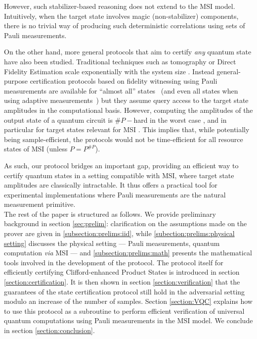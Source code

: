 \documentclass[a4paper,twocolumn,11pt,unpublished]{quantumarticle}
\begin{document}
However, such stabilizer-based reasoning does not extend to the MSI model.
Intuitively, when the target state involves magic (non-stabilizer) components, there is no trivial way of producing such deterministic correlations using sets of Pauli measurements.

On the other hand, more general protocols that aim to certify \textit{any} quantum state have also been studied.
Traditional techniques such as tomography or Direct Fidelity Estimation scale exponentially with the system size \cite{FL11direct, FOS24optimal, SLP11practical}. Instead general-purpose certification protocols based on fidelity witnessing using Pauli measurements are available for ``almost all'' states~\cite{HPS24certifying} (and even all states when using adaptive measurements~\cite{GHO25few}) but they assume query access to the target state amplitudes in the computational basis. However, computing the amplitudes of the output state of a quantum circuit is $\#P-$hard in the worst case \cite{A04quantuma, BFNV18quantum}, and in particular for target states relevant for MSI \cite{YJS18quantum}. This implies that, while potentially being sample-efficient, the protocols \cite{HPS24certifying,GHO25few} would not be time-efficient for all resource states of MSI (unless $P=P^{\#P}$).

 

As such, our protocol bridges an important gap, providing an efficient way to certify quantum states in a setting compatible with MSI, where target state amplitudes are classically intractable. It thus offers a practical tool for experimental implementations where Pauli measurements are the natural measurement primitive.\\

The rest of the paper is structured as follows. We provide preliminary background in section \ref{sec:prelim}: clarification on the assumptions made on the prover are given in \ref{subsection:prelims:iid}, while \ref{subection:prelims:physical setting} discusses the physical setting --- Pauli measurements, quantum computation \emph{via} MSI --- and \ref{subsection:prelims:math} presents the mathematical tools involved in the development of the protocol. The protocol itself
for efficiently certifying Clifford-enhanced Product States
is introduced in section \ref{section:certification}. It is then shown in section \ref{section:verification} that the guarantees of the state certification protocol still hold in the adversarial setting modulo an increase of the number of samples. Section \ref{section:VQC} explains how to use this protocol as a subroutine to perform efficient verification of universal quantum computations using Pauli measurements in the MSI model. We conclude in section \ref{section:conclusion}.
\end{document}
